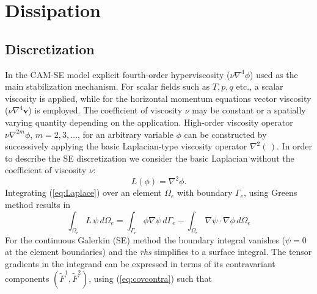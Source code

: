 \documentclass{agujournal}
\begin{document}
{%

%
%
%
%
\appendix
   \section{Dissipation}\label{sec:dissipation}
   \subsection{Discretization}
   In the CAM-SE model explicit  fourth-order hyperviscosity  ($\nu \nabla^4 \phi$) used as 
    the main stabilization mechanism.  For scalar fields such as $T, p, q$ etc., 
   a scalar viscosity   is applied,  while  for the horizontal momentum equations vector viscosity
   ($\nu \nabla^4 \mathbf{v} $) is employed. The coefficient of viscosity $\nu$ may be constant or a spatially varying 
  quantity  depending on the application. High-order viscosity operator $ \nu \nabla^{2m} \phi$, $m=2,3, \dots$, 
    for an arbitrary variable $\phi$  can be constructed 
  by successively applying the basic Laplacian-type viscosity operator $\nabla^2 ( \,)$. In order to describe the SE discretization 
  we consider the basic Laplacian without the coefficient of viscosity $\nu$: 
   \begin{equation}
   L(\phi)  = \nabla^2 \phi .  \label{eq:Laplace}
   \end{equation}
  Integrating  (\ref{eq:Laplace}) over an element $\Omega_e$  with boundary $\Gamma_e$, using Greens method   results in 
    \begin{equation}
  \int_{\Omega_e}  L \, \psi  \,  d \Omega_e  =   \int_{\Gamma_e}  \phi \nabla \psi  \,    d  \Gamma_e - 
                      \int_{\Omega_e}  \nabla \psi \cdot \nabla \phi \,  d \Omega_e  \label{eq:Lweak}
   \end{equation}
   For the continuous Galerkin (SE) method the boundary integral vanishes ($\psi = 0$ at the element boundaries) 
   and the  {\em  rhs} simplifies to 
   a surface integral.   The tensor gradients in the integrand  can be expressed  in terms of its contravariant  components 
   $(\tilde{F}^1, \tilde{F}^2)$, using (\ref{eq:covcontra}) such that 
}
\end{document}
